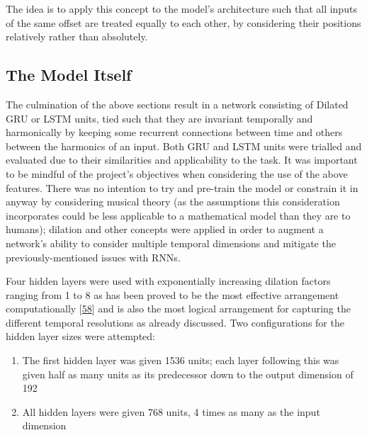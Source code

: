\documentclass[12pt,]{article}
\providecommand{\tightlist}{%
  \setlength{\itemsep}{0pt}\setlength{\parskip}{0pt}}
\begin{document}
The idea is to apply this concept to the model's architecture such that
all inputs of the same offset are treated equally to each other, by
considering their positions relatively rather than absolutely.

\hypertarget{the-model-itself}{%
\subsection{The Model Itself}\label{the-model-itself}}

The culmination of the above sections result in a network consisting of
Dilated GRU or LSTM units, tied such that they are invariant temporally
and harmonically by keeping some recurrent connections between time and
others between the harmonics of an input. Both GRU and LSTM units were
trialled and evaluated due to their similarities and applicability to
the task. It was important to be mindful of the project's objectives
when considering the use of the above features. There was no intention
to try and pre-train the model or constrain it in anyway by considering
musical theory (as the assumptions this consideration incorporates could
be less applicable to a mathematical model than they are to humans);
dilation and other concepts were applied in order to augment a network's
ability to consider multiple temporal dimensions and mitigate the
previously-mentioned issues with RNNs.

Four hidden layers were used with exponentially increasing dilation
factors ranging from 1 to 8 as has been proved to be the most effective
arrangement computationally
{[}\protect\hyperlink{ref-chang2017dilated}{58}{]} and is also the most
logical arrangement for capturing the different temporal resolutions as
already discussed. Two configurations for the hidden layer sizes were
attempted:

\begin{enumerate}
\def\labelenumi{\arabic{enumi}.}
\tightlist
\item
  The first hidden layer was given 1536 units; each layer following this
  was given half as many units as its predecessor down to the output
  dimension of 192
\item
  All hidden layers were given 768 units, 4 times as many as the input
  dimension
\end{enumerate}
\end{document}
